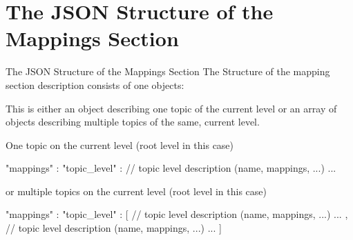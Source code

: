 ﻿\section[nosectionpage]{The JSON Structure of the Mappings Section}

\begin{frame}[fragile]{The JSON Structure of the Mappings Section}
  The  Structure of the mapping section description consists of one objects:
  \begin{description}
    \item[topic\_level] This is either an object describing one topic of the current level or an array of objects describing multiple topics of the same, current level.
  \end{description}
  One topic on the current level (root level in this case)

  \begin{jsoncode}[gobble=4]
    {
        "mappings" : {
            "topic_level" : {                  // topic level description (name, mappings, ...)
                ...
            }
        }
    }
  \end{jsoncode}
  or multiple topics on the current level (root level in this case)
  \begin{jsoncode}[gobble=4]
    {
        "mappings" : {
            "topic_level" : [{                    // topic level description (name, mappings, ...)
            ...
            }, {                                  // topic level description (name, mappings, ...)
                ...
            }]
        }
    }
  \end{jsoncode}
\end{frame}


